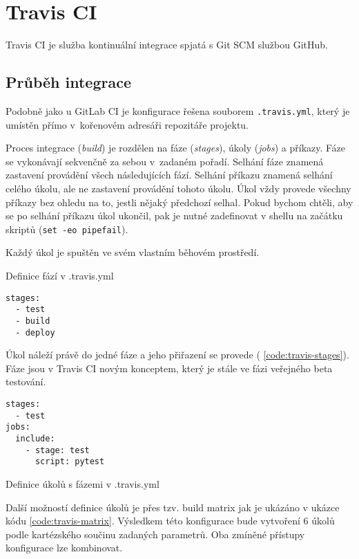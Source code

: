 \section{Travis CI}

Travis CI je služba kontinuální integrace spjatá s Git SCM službou GitHub.

\subsection{Průběh integrace}

Podobně jako u GitLab CI je konfigurace řešena souborem \verb|.travis.yml|, který je umístěn přímo v~kořenovém adresáři repozitáře projektu.

Proces integrace (\textit{build}) je rozdělen na fáze (\textit{stages}), úkoly (\textit{jobs}) a příkazy.
Fáze se vykonávají sekvenčně za sebou v~zadaném pořadí.
Selhání fáze znamená zastavení provádění všech následujících fází.
Selhání příkazu znamená selhání celého úkolu, ale ne zastavení provádění tohoto úkolu.
Úkol vždy provede všechny příkazy bez ohledu na to, jestli nějaký předchozí selhal. 
Pokud bychom chtěli, aby se po selhání příkazu úkol ukončil, pak je nutné zadefinovat v shellu na začátku skriptů (\verb|set -eo pipefail|).

Každý úkol je spuštěn ve svém vlastním běhovém prostředí.

\begin{listing}[ht]
\caption{Definice fází v .travis.yml}
\begin{verbatim}
stages:
  - test
  - build
  - deploy
\end{verbatim}
\end{listing}

Úkol náleží právě do jedné fáze a jeho přiřazení se provede ( \ref{code:travis-stages}).
Fáze jsou v Travis CI novým konceptem, který je stále ve fázi veřejného beta testování.

\begin{listing}[ht]
\begin{verbatim}
stages:
  - test
jobs:
  include:
    - stage: test
      script: pytest

\end{verbatim}
\label{code:travis-stages}
\caption{Definice úkolů s fázemi v .travis.yml}
\end{listing}

Další možností definice úkolů je přes tzv. build matrix jak je ukázáno v ukázce kódu \ref{code:travis-matrix}.
Výsledkem této konfigurace bude vytvoření 6 úkolů podle kartézského součinu zadaných parametrů.
Oba zmíněné přístupy konfigurace lze kombinovat.

